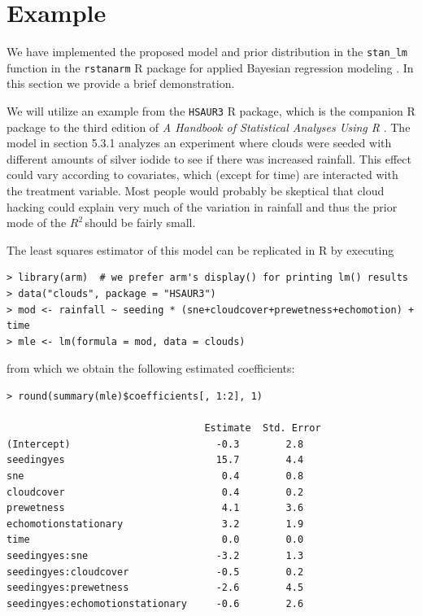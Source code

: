 \documentclass[11pt]{article}
\newcommand{\Rsq}{$R^2\,$}
\begin{document}
\section{Example}
\label{sec:example}


We have implemented the proposed model and prior distribution in the
{\tt stan\_lm} function in the {\tt rstanarm} R package for applied Bayesian
regression modeling \cite{rstanarm}. In this section we provide a brief
demonstration.

We will utilize an example from the {\tt HSAUR3} R package, which is the
companion R package to the third edition of \emph{A Handbook of Statistical
Analyses Using R} \cite{HSAUR3-book}. The model in section 5.3.1 analyzes an
experiment where clouds were seeded with different amounts of silver iodide to
see if there was increased rainfall. This effect could vary according to
covariates, which (except for time) are interacted with the treatment variable.
Most people would probably be skeptical that cloud hacking could explain very
much of the variation in rainfall and thus the prior mode of the \Rsq should be
fairly small.

The least squares estimator of this model can be replicated in R by executing

\vspace{.5cm}
\begin{lstlisting}[frame=lines]
> library(arm)  # we prefer arm's display() for printing lm() results
> data("clouds", package = "HSAUR3")
> mod <- rainfall ~ seeding * (sne+cloudcover+prewetness+echomotion) + time
> mle <- lm(formula = mod, data = clouds)
\end{lstlisting}
\vspace{.5cm}

\noindent from which we obtain the following estimated coefficients:

\vspace{.5cm}
\begin{lstlisting}[frame=lines]
> round(summary(mle)$coefficients[, 1:2], 1)

                                  Estimate  Std. Error
(Intercept)                         -0.3        2.8
seedingyes                          15.7        4.4
sne                                  0.4        0.8
cloudcover                           0.4        0.2
prewetness                           4.1        3.6
echomotionstationary                 3.2        1.9
time                                 0.0        0.0
seedingyes:sne                      -3.2        1.3
seedingyes:cloudcover               -0.5        0.2
seedingyes:prewetness               -2.6        4.5
seedingyes:echomotionstationary     -0.6        2.6
\end{lstlisting}
\vspace{.5cm}
\end{document}
